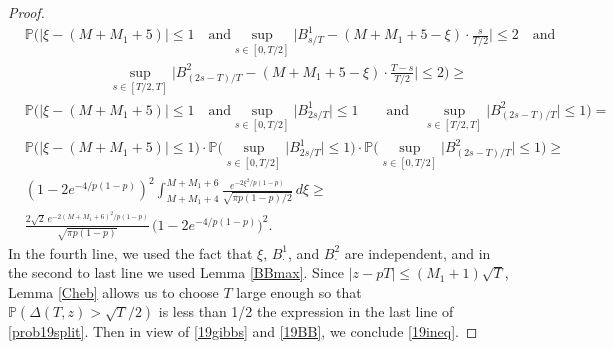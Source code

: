 \begin{proof}
\begin{equation}
	\begin{split}
	&\mathbb{P}\bigg(|\xi - (M+M_1+5)|\leq 1 \quad\mathrm{and} \sup_{s\in[0,T/2]}\Big|B^1_{s/T}-(M+M_1+5-\xi)\cdot\frac{s}{T/2}\Big| \leq 2 \quad \mathrm{and}\\
	&\qquad\qquad\qquad  \sup_{s\in[T/2,T]}\Big|B^2_{(2s-T)/T}-(M+M_1+5-\xi)\cdot\frac{T-s}{T/2}\Big| \leq 2 \bigg) \geq \\
	& \mathbb{P}\bigg(|\xi - (M+M_1+5)|\leq 1 \quad\mathrm{and} \sup_{s\in[0,T/2]}\big|B^1_{2s/T}\big| \leq 1 \qquad \mathrm{and}\quad \sup_{s\in[T/2,T]}\big|B^2_{(2s-T)/T}\big| \leq 1 \bigg) =\\
	& \mathbb{P}\Big(|\xi-(M+M_1+5)|\leq 1\Big)\cdot \mathbb{P}\bigg(\sup_{s\in[0,T/2]} \big|B^1_{2s/T}\big|\leq 1\bigg)\cdot \mathbb{P}\bigg(\sup_{s\in[0,T/2]} \big|B^2_{(2s-T)/T}\big|\leq 1\bigg) \geq\\
	& \left(1-2e^{-4/p(1-p)}\right)^2 \int_{M+M_1+4}^{M+M_1+6} \frac{e^{-2\xi^2/p(1-p)}}{\sqrt{\pi p(1-p)/2}}\,d\xi \geq\\
	& \frac{2\sqrt{2}\,e^{-2(M+M_1+6)^2/p(1-p)}}{\sqrt{\pi p(1-p)}}\,\big(1-2e^{-4/p(1-p)}\big)^2.
	\end{split}
	\end{equation}
	In the fourth line, we used the fact that $\xi$, $B^1_\cdot$, and $B^2_\cdot$ are independent, and in the second to last line we used Lemma \ref{BBmax}. Since $|z-pT|\leq (M_1+1)\sqrt{T}$, Lemma \ref{Cheb} allows us to choose $T$ large enough so that $\mathbb{P}(\Delta(T,z) > \sqrt{T}/2)$ is less than 1/2 the expression in the last line of \eqref{prob19split}. Then in view of \eqref{19gibbs} and \eqref{19BB}, we conclude \eqref{19ineq}.
	
\end{proof}
